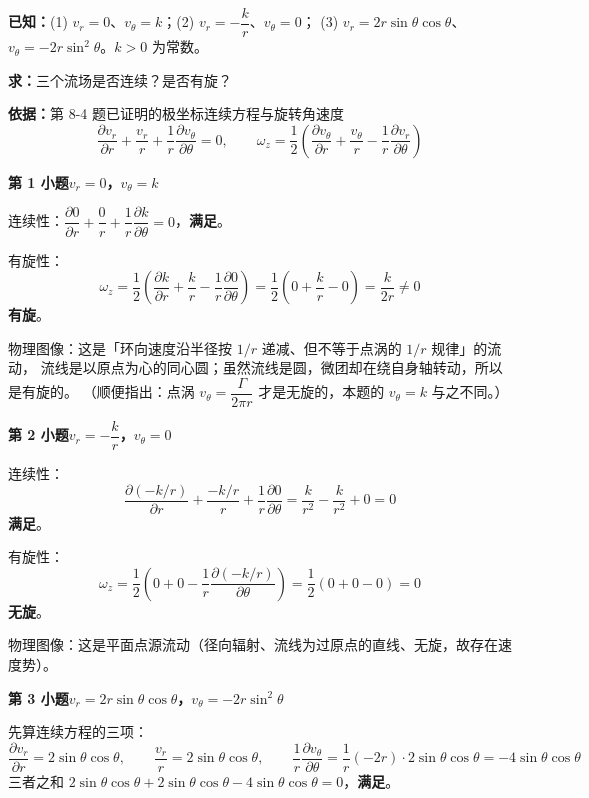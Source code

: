 \begin{jie}
\textbf{已知：}(1) $v_r=0$、$v_\theta=k$；(2) $v_r=-\dfrac{k}{r}$、$v_\theta=0$；
(3) $v_r=2r\sin\theta\cos\theta$、$v_\theta=-2r\sin^2\theta$。$k>0$ 为常数。

\textbf{求：}三个流场是否连续？是否有旋？

\textbf{依据：}第 8-4 题已证明的极坐标连续方程与旋转角速度
\[ \frac{\partial v_r}{\partial r}+\frac{v_r}{r}+\frac{1}{r}\frac{\partial v_\theta}{\partial\theta}=0,\qquad
   \omega_z=\frac{1}{2}\left(\frac{\partial v_\theta}{\partial r}+\frac{v_\theta}{r}-\frac{1}{r}\frac{\partial v_r}{\partial\theta}\right) \]

\textbf{第 1 小题\quad $v_r=0$，$v_\theta=k$}

连续性：$\dfrac{\partial 0}{\partial r}+\dfrac{0}{r}+\dfrac{1}{r}\dfrac{\partial k}{\partial\theta}=0$，\textbf{满足}。

有旋性：
\[ \omega_z=\frac{1}{2}\left(\frac{\partial k}{\partial r}+\frac{k}{r}-\frac{1}{r}\frac{\partial 0}{\partial\theta}\right)
 =\frac{1}{2}\left(0+\frac{k}{r}-0\right)=\frac{k}{2r}\neq0 \]
\textbf{有旋}。

物理图像：这是「环向速度沿半径按 $1/r$ 递减、但不等于点涡的 $1/r$ 规律」的流动，
流线是以原点为心的同心圆；虽然流线是圆，微团却在绕自身轴转动，所以是有旋的。
（顺便指出：点涡 $v_\theta=\dfrac{\Gamma}{2\pi r}$ 才是无旋的，本题的 $v_\theta=k$ 与之不同。）

\textbf{第 2 小题\quad $v_r=-\dfrac{k}{r}$，$v_\theta=0$}

连续性：
\[ \frac{\partial(-k/r)}{\partial r}+\frac{-k/r}{r}+\frac{1}{r}\frac{\partial 0}{\partial\theta}
 =\frac{k}{r^2}-\frac{k}{r^2}+0=0 \]
\textbf{满足}。

有旋性：
\[ \omega_z=\frac{1}{2}\left(0+0-\frac{1}{r}\frac{\partial(-k/r)}{\partial\theta}\right)
 =\frac{1}{2}\left(0+0-0\right)=0 \]
\textbf{无旋}。

物理图像：这是平面点源流动（径向辐射、流线为过原点的直线、无旋，故存在速度势）。

\textbf{第 3 小题\quad $v_r=2r\sin\theta\cos\theta$，$v_\theta=-2r\sin^2\theta$}

先算连续方程的三项：
\[ \frac{\partial v_r}{\partial r}=2\sin\theta\cos\theta,\qquad
   \frac{v_r}{r}=2\sin\theta\cos\theta,\qquad
   \frac{1}{r}\frac{\partial v_\theta}{\partial\theta}=\frac{1}{r}\left(-2r\right)\cdot 2\sin\theta\cos\theta=-4\sin\theta\cos\theta \]
三者之和 $2\sin\theta\cos\theta+2\sin\theta\cos\theta-4\sin\theta\cos\theta=0$，\textbf{满足}。


\end{jie}
